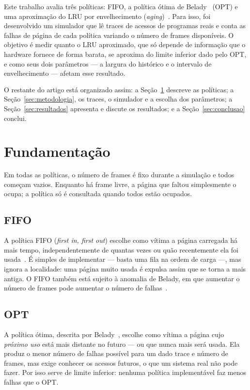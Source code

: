 \documentclass[12pt]{article}
\begin{document}
Este trabalho avalia três políticas: FIFO, a política ótima de
Belady~\cite{belady:66} (OPT) e uma aproximação do LRU por envelhecimento
(\emph{aging})~\cite{tanenbaum:15}. Para isso, foi desenvolvido um simulador
que lê traces de acessos de programas reais e conta as falhas de página de
cada política variando o número de frames disponíveis. O objetivo é medir
quanto o LRU aproximado, que só depende de informação que o hardware fornece
de forma barata, se aproxima do limite inferior dado pelo OPT, e como seus dois
parâmetros --- a largura do histórico e o intervalo de envelhecimento ---
afetam esse resultado.

O restante do artigo está organizado assim: a Seção~\ref{sec:fundamentacao}
descreve as políticas; a Seção~\ref{sec:metodologia}, os traces, o simulador e
a escolha dos parâmetros; a Seção~\ref{sec:resultados} apresenta e discute os
resultados; e a Seção~\ref{sec:conclusao} conclui.

\section{Fundamentação}\label{sec:fundamentacao}

Em todas as políticas, o número de frames é fixo durante a simulação e todos
começam vazios. Enquanto há frame livre, a página que faltou simplesmente o
ocupa; a política só é consultada quando todos estão ocupados.

\subsection{FIFO}

A política FIFO (\emph{first in, first out}) escolhe como vítima a página
carregada há mais tempo, independentemente de quantas vezes ou quão
recentemente ela foi usada~\cite{silberschatz:18}. É simples de implementar ---
basta uma fila na ordem de carga ---, mas ignora a localidade: uma página muito
usada é expulsa assim que se torna a mais antiga. O FIFO também está sujeito à
anomalia de Belady, em que aumentar o número de frames pode aumentar o número
de falhas~\cite{tanenbaum:15}.

\subsection{OPT}

A política ótima, descrita por Belady~\cite{belady:66}, escolhe como vítima a
página cujo \emph{próximo uso} está mais distante no futuro --- ou que nunca
mais será usada. Ela produz o menor número de falhas possível para um dado
trace e número de frames, mas exige conhecer os acessos futuros, o que um
sistema real não pode fazer. Por isso serve de limite inferior: nenhuma
política implementável faz menos falhas que o OPT.
\end{document}
